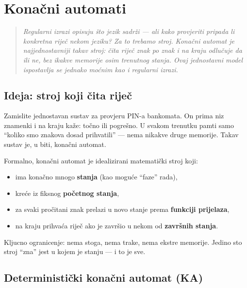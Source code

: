 \chapter{Konačni automati}
\label{chap:3}

\begin{quote}
\itshape
Regularni izrazi opisuju što jezik sadrži --- ali kako provjeriti
pripada li konkretna riječ nekom jeziku? Za to trebamo stroj.
Konačni automat je najjednostavniji takav stroj: čita riječ znak po
znak i na kraju odlučuje da ili ne, bez ikakve memorije osim
trenutnog stanja. Ovaj jednostavni model ispostavlja se jednako
moćnim kao i regularni izrazi.
\end{quote}


\section{Ideja: stroj koji čita riječ}

Zamislite jednostavan sustav za provjeru PIN-a bankomata. On prima
niz znamenki i na kraju kaže: točno ili pogrešno. U svakom trenutku
pamti samo ``koliko smo znakova dosad prihvatili'' --- nema nikakve
druge memorije. Takav sustav je, u biti, konačni automat.

Formalno, konačni automat je idealizirani matematički stroj koji:
\begin{itemize}
  \item ima konačno mnogo \textbf{stanja} (kao moguće ``faze'' rada),
  \item kreće iz fiksnog \textbf{početnog stanja},
  \item za svaki pročitani znak prelazi u novo stanje prema
        \textbf{funkciji prijelaza},
    \item na kraju prihvaća riječ ako je završio u nekom od
      \textbf{završnih stanja}.
\end{itemize}

Kljucno ogranicenje: nema stoga, nema trake, nema ekstre memorije.
Jedino sto stroj ``zna'' jest u kojem je stanju --- i to je sve.

\section{Deterministički konačni automat (KA)}


